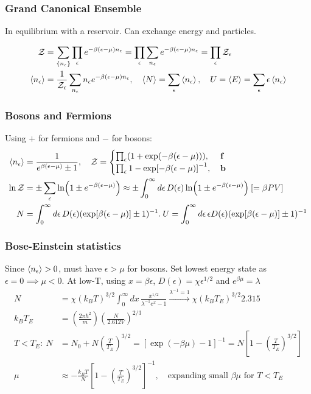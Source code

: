 \documentclass[a4paper, english, 12pt]{article}
\newcommand{\eps}{\epsilon}
\newcommand{\closed}[1]{\left( #1 \right)}
\newcommand{\bracket}[1]{\left[ #1 \right]}
\begin{document}
\begin{multicols*}{2}
\subsubsection*{\scriptsize Grand Canonical Ensemble}
In equilibrium with a reservoir. Can exchange energy and particles. 

\begin{align*}
    \mathcal{Z} &= \sum_{\{n_\epsilon\}} \prod_\epsilon e^{-\beta(\epsilon-\mu)n_\epsilon} = \prod_\epsilon \sum_{n_\epsilon} e^{-\beta(\epsilon-\mu)n_\epsilon} = \prod_\epsilon \mathcal{Z}_\epsilon \\
    \expval{n_\epsilon} &= \frac{1}{\mathcal{Z}_\epsilon} \sum_{n_\epsilon} n_\epsilon e^{-\beta(\epsilon-\mu)n_\epsilon},\quad \expval{N} = \sum_\epsilon \expval{n_\epsilon},\quad U = \expval{E} = \sum_\eps \eps \expval{n_\eps}
\end{align*} 



\subsubsection*{\scriptsize Bosons and Fermions}
Using $+$ for fermions and $-$ for bosons: 
\begin{align*}
    \expval{n_\eps} &= \frac{1}{e^{\beta(\eps-\mu)} \pm 1},\quad \mathcal{Z} = \begin{cases}
        \prod_\eps (1+\exp(-\beta(\eps-\mu))),\:&\textbf{f} \\ 
        \prod_\eps {1-\exp[-\beta(\eps-\mu)]}^{-1},\:&\textbf{b}
    \end{cases} \\
    \ln \mathcal{Z} &= \pm \sum_\eps \ln(1 \pm e^{-\beta(\eps-\mu)}) \approx \pm \int_0^\infty d\eps\, D(\eps) \ln(1 \pm e^{-\beta(\eps-\mu)})\:[=\beta PV] \\
    N &= \int_0^\infty d\eps\,D(\eps) (\exp[\beta(\eps-\mu)]\pm1)^{-1}.\:U = \int_0^\infty d\eps\, \eps D(\eps) (\exp[\beta(\eps-\mu)]\pm1)^{-1} 
\end{align*}



\subsubsection*{\scriptsize Bose-Einstein statistics}
Since $\expval{n_\eps}>0$, must have $\eps>\mu$ for bosons. Set lowest energy state as $\eps=0\implies\mu<0$. At low-T, using $x=\beta\eps$, $D(\eps)=\chi \eps^{1/2}$ and $e^{\beta\mu}=\lambda$ 
\begin{align*}
    N &= \chi (k_B T)^{3/2} \int_0^\infty dx\, \frac{x^{1/2}}{\lambda^{-1} e^x - 1} \xrightarrow{\lambda^{-1}=1} \chi (k_B T_E)^{3/2} 2.315 \\
    k_B T_E &= \left( \frac{2\pi\hbar^2}{m}\right) \left( \frac{N}{2.612V} \right)^{2/3} \\
    T<T_E:\:N &= N_0 + N \left(\frac{T}{T_E}\right)^{3/2} = [\exp(-\beta\mu)-1]^{-1} = N\bracket{1-\closed{\frac{T}{T_E}}^{3/2} } \\
    \mu &\approx -\frac{k_B T}{N}\bracket{1-\closed{\frac{T}{T_E}}^{3/2}}^{-1},\quad\text{expanding small }\beta\mu \text{ for } T<T_E
\end{align*}


\end{multicols*}
\end{document}
